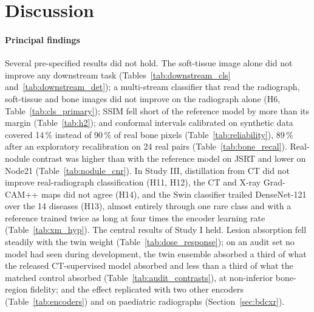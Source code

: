 \section{Discussion}
\label{sec:discussion}
\paragraph{Principal findings} Several pre-specified results did not hold. The soft-tissue image alone did not improve any downstream task
(Tables~\ref{tab:downstream_cls} and~\ref{tab:downstream_det}); a multi-stream classifier that read the radiograph, soft-tissue and bone
images did not improve on the radiograph alone (H6, Table~\ref{tab:cls_primary}); SSIM fell short of the reference model by more than its
margin (Table~\ref{tab:h2}); and conformal intervals calibrated on synthetic data covered 14\,\% instead of 90\,\% of real bone pixels
(Table~\ref{tab:reliability}), 89\,\% after an exploratory recalibration on 24 real pairs (Table~\ref{tab:bone_recal}). Real-nodule contrast
was higher than with the reference model on JSRT and lower on Node21 (Table~\ref{tab:nodule_cnr}). In Study III, distillation from CT did not
improve real-radiograph classification (H11, H12), the CT and X-ray Grad-CAM++ maps did not agree (H14), and the Swin classifier trailed
DenseNet-121 over the 14 diseases (H13), almost entirely through one rare class and with a reference trained twice as long at four times
the encoder learning rate (Table~\ref{tab:xm_hyp}). The central results of Study I held.
Lesion absorption fell steadily with the twin weight (Table~\ref{tab:dose_response}); on an audit set no model had seen during development,
the twin ensemble absorbed a third of what the released CT-supervised model absorbed and less than a third of what the matched control
absorbed (Table~\ref{tab:audit_contrasts}), at non-inferior bone-region fidelity; and the effect replicated with two other encoders
(Table~\ref{tab:encoders}) and on paediatric radiographs (Section~\ref{sec:bdcxr}).

